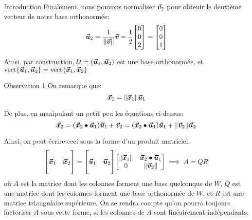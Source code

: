 \documentclass[a4paper]{article}
\begin{document}
\begin{parag}{Introduction}
    Finalement, nous pouvons normaliser $\bm{\protect\vec{v}}_2$ pour obtenir le deuxième vecteur de notre base orthonormée: 
    \[\bvec{u}_2 = \frac{1}{\left\|\bvec{v}\right\|} \bvec{v} = \frac{1}{2} \begin{bmatrix} 0 \\ 0 \\ 2 \end{bmatrix} = \begin{bmatrix} 0 \\ 0 \\ 1 \end{bmatrix} \]
    
    Ainsi, par construction, $\mathcal{U} = \left(\bvec{u}_1, \bvec{u}_2\right)$ est une base orthonormée, et $\vect\left\{\bvec{u}_1, \bvec{u}_2\right\} = \vect\left\{\bvec{x}_1, \bvec{x}_2\right\}$

    \begin{subparag}{Observation 1}
        On remarque que: 
        \[\bvec{x}_1 = \left\|\bvec{x}_1\right\|\bvec{u}_1\]

        De plus, en manipulant un petit peu les équations ci-dessus: 
        \[\bvec{x}_2 = \left(\bvec{x}_2 \dotprod \bvec{u}_1\right)\bvec{u}_1 + \bvec{v}_2 = \left(\bvec{x}_2 \dotprod \bvec{u}_1\right) \bvec{u}_1 + \left\|\bvec{v}_2\right\| \bvec{u}_2\]
        
        Ainsi, on peut écrire ceci sous la forme d'un produit matriciel: 
        \[\begin{bmatrix}  &  \\ \bvec{x}_1 & \bvec{x}_2 \\  &  \end{bmatrix} = \begin{bmatrix}  &  \\ \bvec{u}_1 & \bvec{u}_2 \\  &  \end{bmatrix} \begin{bmatrix} \left\|\bvec{x}_1\right\| & \bvec{x}_2 \dotprod \bvec{u}_1 \\ 0 & \left\|\bvec{v}_2\right\| \end{bmatrix} \implies A = QR\]
        où $A$ est la matrice dont les colonnes forment une base quelconque de $W$, $Q$ est une matrice dont les colonnes forment une base orthonormée de $W$, et $R$ est une matrice triangulaire supérieure. On se rendra compte qu'on pourra toujours factoriser $A$ sous cette forme, si les colonnes de $A$ sont linéairement indépendants.
    \end{subparag}


\end{parag}
\end{document}
